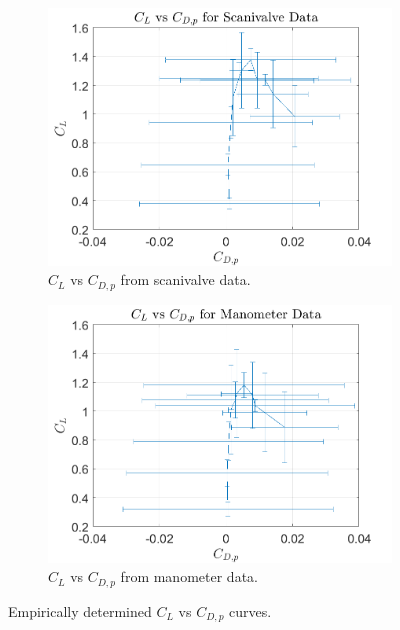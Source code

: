 \documentclass[runningheads]{llncs}
\begin{document}
\begin{figure}[h]
    \centering
    \begin{subfigure}[b]{0.45\textwidth}
         \centering
         \includegraphics[width=\textwidth]{figures/scanivalve_cl_vs_cd.png}
         \caption{$C_L$ vs $C_{D,p}$ from scanivalve data.}
         \label{fig:scani_cL_cD}
     \end{subfigure}
     \begin{subfigure}[b]{0.45\textwidth}
         \centering
         \includegraphics[width=\textwidth]{figures/manometer_cl_vs_cd.png}
         \caption{$C_L$ vs $C_{D,p}$ from manometer data.}
         \label{fig:mano_cL_cD}
     \end{subfigure}
    \caption{Empirically determined $C_L$ vs $C_{D,p}$ curves.}
    \label{fig:cL_vs_cD}
\end{figure}
\end{document}
